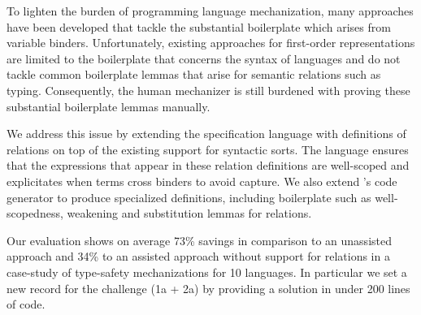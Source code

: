 
To lighten the burden of programming language mechanization, many approaches
have been developed that tackle the substantial boilerplate which arises from
variable binders. Unfortunately, existing approaches for first-order
representations are limited to the boilerplate that concerns the syntax of
languages and do not tackle common boilerplate lemmas that arise for semantic
relations such as typing. Consequently, the human mechanizer is still burdened
with proving these substantial boilerplate lemmas manually.

We address this issue by extending the \Knot specification language with
definitions of relations on top of the existing support for
syntactic sorts. The language ensures that the expressions that appear in
these relation definitions are well-scoped and explicitates when terms cross
binders to avoid capture. We also extend \Knot's code generator \Needle to produce
specialized \Coq definitions, including boilerplate such as well-scopedness,
weakening and
substitution lemmas for relations.


Our evaluation shows on average 73\% savings in comparison to an unassisted
approach and 34\% to an assisted approach without support for relations in a
case-study of type-safety mechanizations for 10 languages. In particular we set
a new record for the \POPLmark challenge (1a + 2a) by providing a solution in
under 200 lines of code.


